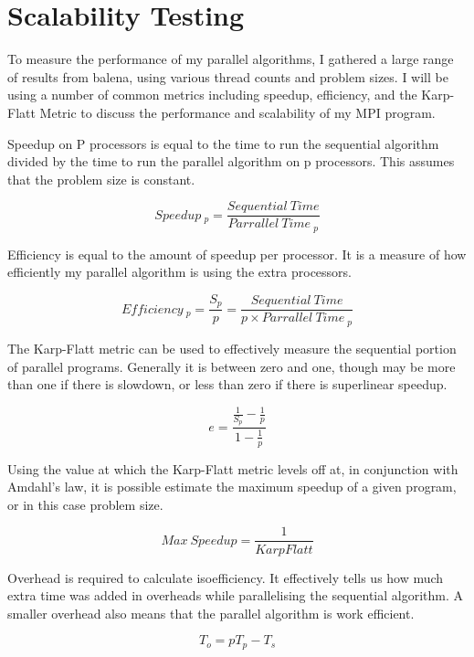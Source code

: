 \documentclass{report}
\begin{document}
\chapter{Scalability Testing}
To measure the performance of my parallel algorithms, I gathered a large range of results from balena, using various thread counts and problem sizes. I will be using a number of common metrics including speedup, efficiency, and the Karp-Flatt Metric to discuss the performance and scalability of my MPI program.\newline

Speedup on P processors is equal to the time to run the sequential algorithm divided by the time to run the parallel algorithm on p processors. This assumes that the problem size is constant.

$$Speedup\ _p=\frac{Sequential\ Time}{Parrallel\ Time\ _p}$$\newline

Efficiency is equal to the amount of speedup per processor. It is a measure of how efficiently my parallel algorithm is using the extra processors.

$$Efficiency\ _p=\frac{S_p}{p}=\frac{Sequential\ Time}{p\times Parrallel\ Time\ _p}$$\newline

The Karp-Flatt metric can be used to effectively measure the sequential portion of parallel programs. Generally it is between zero and one, though may be more than one if there is slowdown, or less than zero if there is superlinear speedup.\newline

$$e=\frac{\frac{1}{S_p}-\frac{1}{p}}{1-\frac{1}{p}}$$\newline

Using the value at which the Karp-Flatt metric levels off at, in conjunction with Amdahl's law, it is possible estimate the maximum speedup of a given program, or in this case problem size.\newline

$$Max\ Speedup=\frac{1}{Karp Flatt}$$\newline

Overhead is required to calculate isoefficiency. It effectively tells us how much extra time was added in overheads while parallelising the sequential algorithm. A smaller overhead also means that the parallel algorithm is work efficient.\newline

$$T_o=pT_p - T_s$$\newline
\end{document}
